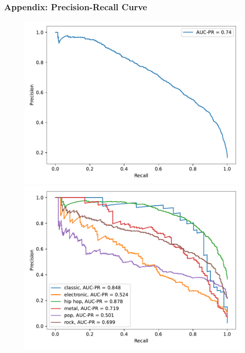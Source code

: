 \documentclass[8pt]{beamer}
\begin{document}
\begin{frame}
    \frametitle{Appendix: Precision-Recall Curve}
    \begin{figure}
        \begin{minipage}[b]{0.48\textwidth}
            \centering
            \includegraphics[width=\textwidth]{figures/PR_curve.pdf}
        \end{minipage}
        \hfill
        \begin{minipage}[b]{0.48\textwidth}
            \centering
            \includegraphics[width=\textwidth]{figures/PR_curve_genres.pdf}
        \end{minipage}
    \end{figure}
\end{frame}
\end{document}
